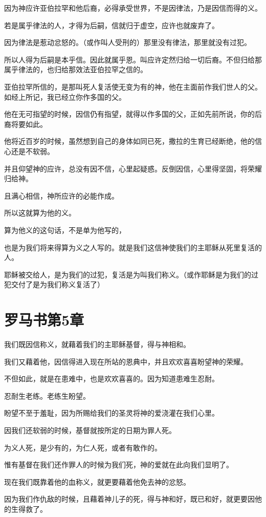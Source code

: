 \documentclass[12pt,oneside]{book}
\begin{document}
因为神应许亚伯拉罕和他后裔，必得承受世界，不是因律法，乃是因信而得的义。

若是属乎律法的人，才得为后嗣，信就归于虚空，应许也就废弃了。

因为律法是惹动忿怒的。（或作叫人受刑的）那里没有律法，那里就没有过犯。

所以人得为后嗣是本乎信。因此就属乎恩。叫应许定然归给一切后裔。不但归给那属乎律法的，也归给那效法亚伯拉罕之信的。

亚伯拉罕所信的，是那叫死人复活使无变为有的神，他在主面前作我们世人的父。如经上所记，我已经立你作多国的父。

他在无可指望的时候，因信仍有指望，就得以作多国的父，正如先前所说，你的后裔将要如此。

他将近百岁的时候，虽然想到自己的身体如同已死，撒拉的生育已经断绝，他的信心还是不软弱。

并且仰望神的应许，总没有因不信，心里起疑惑。反倒因信，心里得坚固，将荣耀归给神。

且满心相信，神所应许的必能作成。

所以这就算为他的义。

算为他义的这句话，不是单为他写的，

也是为我们将来得算为义之人写的。就是我们这信神使我们的主耶稣从死里复活的人。

耶稣被交给人，是为我们的过犯，复活是为叫我们称义。（或作耶稣是为我们的过犯交付了是为我们称义复活了）

\chapter{罗马书第5章}
我们既因信称义，就藉着我们的主耶稣基督，得与神相和。

我们又藉着他，因信得进入现在所站的恩典中，并且欢欢喜喜盼望神的荣耀。

不但如此，就是在患难中，也是欢欢喜喜的。因为知道患难生忍耐。

忍耐生老练。老练生盼望。

盼望不至于羞耻，因为所赐给我们的圣灵将神的爱浇灌在我们心里。

因我们还软弱的时候，基督就按所定的日期为罪人死。

为义人死，是少有的，为仁人死，或者有敢作的。

惟有基督在我们还作罪人的时候为我们死，神的爱就在此向我们显明了。

现在我们既靠着他的血称义，就更要藉着他免去神的忿怒。

因为我们作仇敌的时候，且藉着神儿子的死，得与神和好，既已和好，就更要因他的生得救了。
\end{document}
